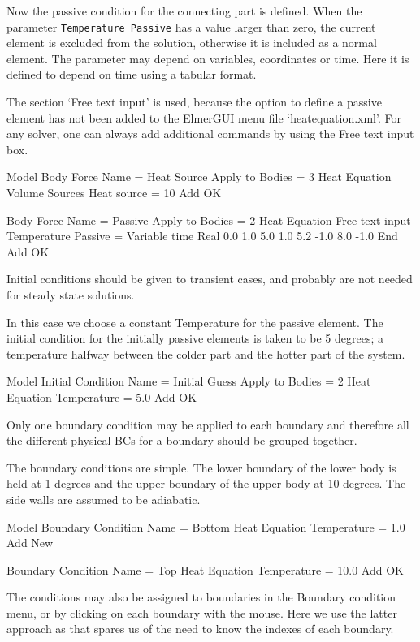 Now the passive condition for the connecting part is defined. When the parameter  \texttt{Temperature Passive} has a value larger than zero, the current element is excluded from the solution, otherwise it is included as a normal element. The parameter may depend on variables, coordinates or time. Here it is defined to depend on time using a tabular format.

The section `Free text input' is used, because the option to define a passive element has not been added to the ElmerGUI menu file `heatequation.xml'.  For any solver, one can always add additional commands by using the Free text input box.

\ttbegin
Model
  Body Force
    Name = Heat Source
    Apply to Bodies = 3
    Heat Equation
       Volume Sources
         Heat source = 10
    Add 
    OK

  Body Force
    Name = Passive
    Apply to Bodies = 2
    Heat Equation
       Free text input
         Temperature Passive = Variable time
            Real
              0.0     1.0
              5.0     1.0
              5.2    -1.0
              8.0    -1.0
           End
    Add 
    OK
\ttend    

Initial conditions should be given to transient cases, and probably are not needed for steady state solutions. 

In this case we choose a constant Temperature for the passive element.  The initial condition for the initially passive elements is taken to be 5 degrees; a temperature halfway between the colder part and the hotter part of the system.
 
\ttbegin
Model
  Initial Condition 
    Name = Initial Guess
    Apply to Bodies = 2
    Heat Equation
      Temperature = 5.0
    Add 
    OK
\ttend

Only one boundary condition may be applied to each boundary and therefore all the different physical BCs for a boundary should be grouped together. 

The boundary conditions are simple. The lower boundary of the lower body is held at 1 degrees and the upper boundary of the upper body at 10 degrees.  The side walls are assumed to be adiabatic.

\ttbegin
Model
  Boundary Condition
    Name = Bottom
    Heat Equation
      Temperature = 1.0
    Add
    New

  Boundary Condition
    Name = Top
    Heat Equation
      Temperature = 10.0
    Add
   OK 
\ttend   

The conditions may also be assigned to boundaries in the Boundary condition menu, or by clicking on each boundary with the mouse. Here we use the latter approach as that spares us of the need to know the indexes of each boundary.

